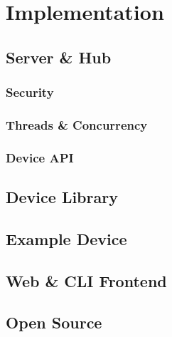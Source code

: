 \chapter{Implementation} \label{cha:chapter3}

\section{Server \& Hub} \label{sec:chap3:server}
\subsection{Security} \label{sec:chap3:server:security}

\subsection{Threads \& Concurrency} \label{sec:chap3:server:threads}

\subsection{Device API} \label{sec:chap3:server:api}

\section{Device Library} \label{sec:chap3:devicelib}
\section{Example Device} \label{sec:chap3:deviceexample}
\section{Web \& CLI Frontend} \label{sec:chap3:frontend}
\section{Open Source} \label{sec:chap3:opensource}
